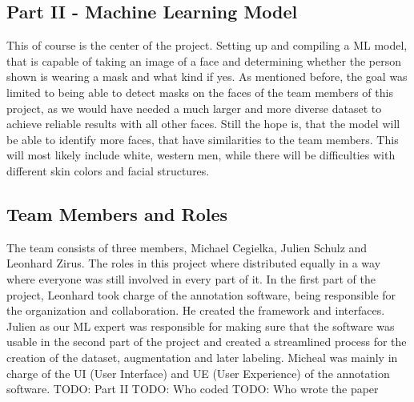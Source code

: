 \subsection{Part II - Machine Learning Model}

This of course is the center of the project. Setting up and compiling a ML
model, that is capable of taking an image of a face and determining whether the
person shown is wearing a mask and what kind if yes.
\newline
As mentioned before, the goal was limited to being able to detect masks on the
faces of the team members of this project, as we would have needed a much larger
and more diverse dataset to achieve reliable results with all other faces. Still
the hope is, that the model will be able to identify more faces, that have
similarities to the team members. This will most likely include white, western
men, while there will be difficulties with different skin colors and facial
structures.

\subsection{Team Members and Roles}

The team consists of three members, Michael Cegielka, Julien Schulz and Leonhard
Zirus. The roles in this project where distributed equally in a way where
everyone was still involved in every part of it. 
\newline
In the first part of the project, Leonhard took charge of the annotation
software, being responsible for the organization and collaboration. He created
the framework and interfaces. Julien as our ML expert was responsible for making
sure that the software was usable in the second part of the project and created
a streamlined process for the creation of the dataset, augmentation and later
labeling. Micheal was mainly in charge of the UI (User Interface) and UE (User
Experience) of the annotation software. 
\newline
TODO: Part II 
TODO: Who coded
TODO: Who wrote the paper
